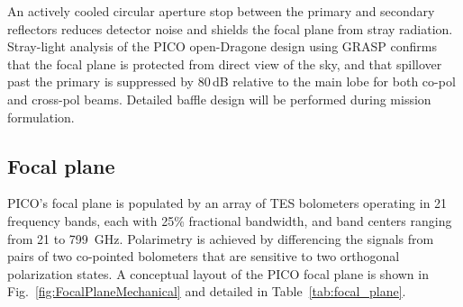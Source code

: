 An actively cooled circular aperture stop between the primary and
secondary reflectors reduces detector noise and shields the focal
plane from stray radiation. Stray-light analysis of the PICO
open-Dragone design using GRASP confirms that the focal plane is
protected from direct view of the sky, and that spillover past the
primary is suppressed by 80\,dB relative to the main lobe for both
co-pol and cross-pol beams. Detailed baffle design will be performed
during mission formulation.



\subsection{Focal plane}
\label{sec:focal_plane} %

PICO's focal plane is populated by an %
array of \ac{TES} bolometers operating in 21 %
frequency bands, each with 25\% fractional bandwidth, and band centers ranging from 21 to 799~GHz. 
Polarimetry is achieved by differencing the signals from pairs of two co-pointed bolometers that are sensitive to two orthogonal polarization states.  A conceptual layout of the PICO focal plane is shown in Fig.~\ref{fig:FocalPlaneMechanical} and detailed in Table~\ref{tab:focal_plane}.

